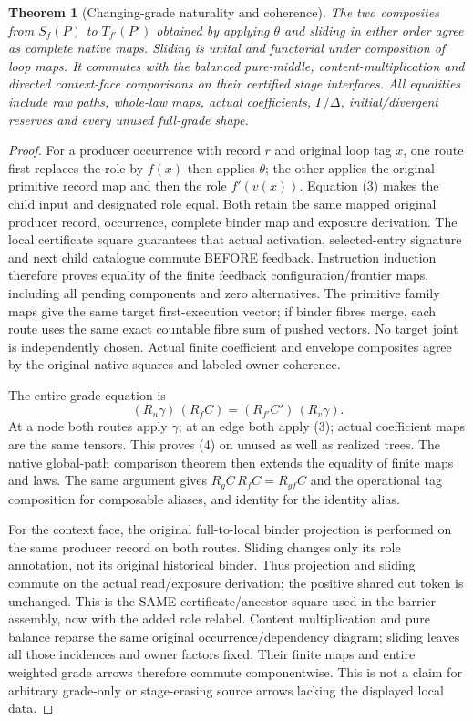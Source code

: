 \documentclass[11pt]{article}
\newtheorem{theorem}{Theorem}\newtheorem{proposition}{Proposition}
\begin{document}
\begin{theorem}[Changing-grade naturality and coherence]
The two composites from $S_f(P)$ to $T_{f'}(P')$ obtained by applying $\theta$ and sliding in either order agree as complete native maps. Sliding is unital and functorial under composition of loop maps. It commutes with the balanced pure-middle, content-multiplication and directed context-face comparisons on their certified stage interfaces. All equalities include raw paths, whole-law maps, actual coefficients, $\Gamma/\Delta$, initial/divergent reserves and every unused full-grade shape.
\end{theorem}
\begin{proof}
For a producer occurrence with record $r$ and original loop tag $x$, one route first replaces the role by $f(x)$ then applies $\theta$; the other applies the original primitive record map and then the role $f'(v(x))$. Equation (3) makes the child input and designated role equal. Both retain the same mapped original producer record, occurrence, complete binder map and exposure derivation. The local certificate square guarantees that actual activation, selected-entry signature and next child catalogue commute BEFORE feedback. Instruction induction therefore proves equality of the finite feedback configuration/frontier maps, including all pending components and zero alternatives. The primitive family maps give the same target first-execution vector; if binder fibres merge, each route uses the same exact countable fibre sum of pushed vectors. No target joint is independently chosen. Actual finite coefficient and envelope composites agree by the original native squares and labeled owner coherence.

The entire grade equation is
\[
 (R_u\gamma)\,(R_fC)=(R_{f'}C')\,(R_v\gamma). \tag{4}
\]
At a node both routes apply $\gamma$; at an edge both apply (3); actual coefficient maps are the same tensors. This proves (4) on unused as well as realized trees. The native global-path comparison theorem then extends the equality of finite maps and laws. The same argument gives $R_gC\,R_fC=R_{gf}C$ and the operational tag composition for composable aliases, and identity for the identity alias.

For the context face, the original full-to-local binder projection is performed on the same producer record on both routes. Sliding changes only its role annotation, not its original historical binder. Thus projection and sliding commute on the actual read/exposure derivation; the positive shared cut token is unchanged. This is the SAME certificate/ancestor square used in the barrier assembly, now with the added role relabel. Content multiplication and pure balance reparse the same original occurrence/dependency diagram; sliding leaves all those incidences and owner factors fixed. Their finite maps and entire weighted grade arrows therefore commute componentwise. This is not a claim for arbitrary grade-only or stage-erasing source arrows lacking the displayed local data.
\end{proof}
\end{document}
